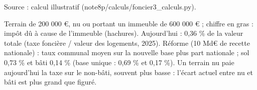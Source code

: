 Source : calcul illustratif (note8p/calculs/foncier3\_calculs.py).\par Terrain de 200 000 €, nu ou portant un immeuble de 600 000 € ; chiffre en gras : impôt dû à cause de l'immeuble (hachures). Aujourd'hui : 0,36 \% de la valeur totale (taxe foncière / valeur des logements, 2025). Réforme (10 Md€ de recette nationale) : taux communal moyen sur la nouvelle base plus part nationale ; sol 0,73 \% et bâti 0,14 \% (base unique : 0,69 \% et 0,17 \%). Un terrain nu paie aujourd'hui la taxe sur le non-bâti, souvent plus basse : l'écart actuel entre nu et bâti est plus grand que figuré.

